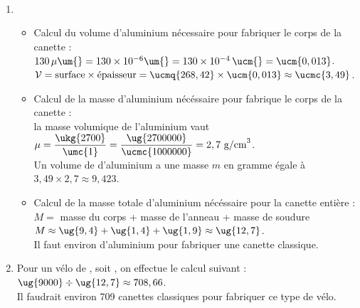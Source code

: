 \ \\ [-5mm]
   \begin{enumerate}
      \item
         \begin{itemize}
            \item Calcul du volume d'aluminium nécessaire pour fabriquer le corps de la canette : \\
               $130\,\mu\um{} =130\times10^{-6}\um{} =130\times10^{-4}\,\ucm{} =\ucm{0,013}$. \\
               $\mathcal{V} =\text{surface}\times\text{épaisseur} =\ucmq{268,42}\times\ucm{0,013} \approx\ucmc{3,49}$. \\
            \item Calcul de la masse d'aluminium nécéssaire pour fabrique le corps de la canette : \\ [1mm]
               la masse volumique de l'aluminium vaut $\mu =\dfrac{\ukg{2700}}{\umc{1}} =\dfrac{\ug{2700000}}{\ucmc{1000000}} =2,7\text{ g/cm}^3$. \\ [1mm]
               Un volume de  d'aluminium a une masse $m$ en gramme égale à $3,49\times2,7 \approx9,423$.
            \item Calcul de la masse totale d'aluminium nécéssaire pour la canette entière : \\
               $M =$ masse du corps + masse de l'anneau + masse de soudure \\
               $M \approx\ug{9,4}+\ug{1,4}+\ug{1,9} \approx\ug{12,7}$. \\
               {\blue Il faut environ  d'aluminium pour fabriquer une canette classique}.
         \end{itemize}
      \item Pour un vélo de , soit , on effectue le calcul suivant : \\
         $\ug{9000}\div\ug{12,7} \approx 708,66$. \\
         {\blue Il faudrait environ 709 canettes classiques pour fabriquer ce type de vélo}.
   \end{enumerate}
